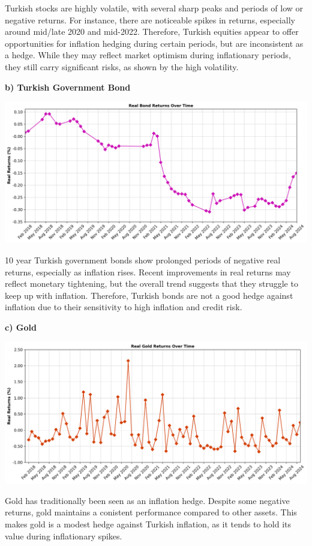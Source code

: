 \documentclass[
]{article}
\begin{document}
Turkish stocks are highly volatile, with several sharp peaks and periods of low or negative returns. For instance, there are noticeable spikes in returns, especially around mid/late 2020 and mid-2022. Therefore, Turkish equities appear to offer opportunities for inflation hedging during certain periods, but are inconsistent as a hedge. While they may reflect market optimism during inflationary periods, they still carry significant risks, as shown by the high volatility.

\textbf{b) Turkish Government Bond}

\includegraphics[width=\textwidth]{real_bond_returns.png}

10 year Turkish government bonds show prolonged periods of negative real returns, especially as inflation rises. Recent improvements in real returns may reflect monetary tightening, but the overall trend suggests that they struggle to keep up with inflation. Therefore, Turkish bonds are not a good hedge against inflation due to their sensitivity to high inflation and credit risk.

\textbf{c) Gold}

\includegraphics[width=\textwidth]{real_gold_returns.png}

Gold has traditionally been seen as an inflation hedge. Despite some negative returns, gold maintains a conistent performance compared to other assets. This makes gold is a modest hedge against Turkish inflation, as it tends to hold its value during inflationary spikes. 
\end{document}
